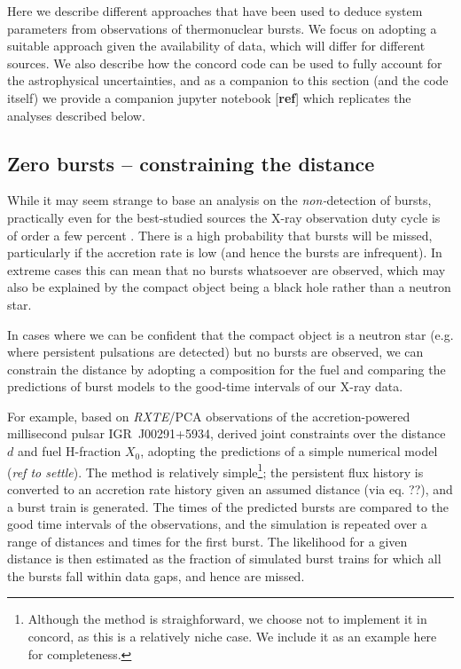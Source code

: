 \documentclass{aastex63}
\begin{document}


Here we describe different approaches that have been used to deduce system parameters from observations of thermonuclear bursts.
%
We focus on adopting a suitable approach given the availability of data, which will differ for different sources. 
%
We also describe how the {\sc concord} code can be used to fully account for the astrophysical uncertainties, and as a companion to this section (and the code itself) we provide a companion {\sc jupyter} notebook [{\bf ref}] which replicates the analyses described below.

\subsection{Zero bursts -- constraining the distance}
\label{subsec:zerobursts}

While it may seem strange to base an analysis on the {\it non-}detection of bursts, practically even for the best-studied sources the X-ray observation duty cycle is of order a few percent \cite[e.g.][]{minbar}. There is a high probability that bursts will be missed, particularly if the accretion rate is low (and hence the bursts are infrequent). In extreme cases this can mean that no bursts whatsoever are observed,  which may also be explained by the compact object being a black hole rather than a neutron star.

In cases where we can be confident that the compact object is a neutron star (e.g. where persistent pulsations are detected) but no bursts are observed, we can constrain the distance by adopting a composition for the fuel and comparing the predictions of burst models to the good-time intervals of our X-ray data.

For example, based on {\it RXTE}/PCA observations of the accretion-powered millisecond pulsar IGR~J00291+5934, \cite{gal06b} derived joint constraints over the distance $d$ and fuel H-fraction $X_0$, adopting  the predictions of a simple numerical model ({\it ref to {\sc settle}}). The method is relatively simple\footnote{Although the method is straighforward, we choose not to implement it in {\sc concord}, as this is a relatively niche case. We include it as an example here for completeness.}; 
%
the persistent flux history is converted to an accretion rate history given an assumed distance (via eq. ??), and a burst train is generated. The times of the predicted bursts are compared to the good time intervals of the observations, and the simulation is repeated over a range of distances and times for the first burst. The likelihood for a given distance is then estimated as the fraction of simulated burst trains for which all the bursts fall within data gaps, and hence are missed. 
\end{document}
